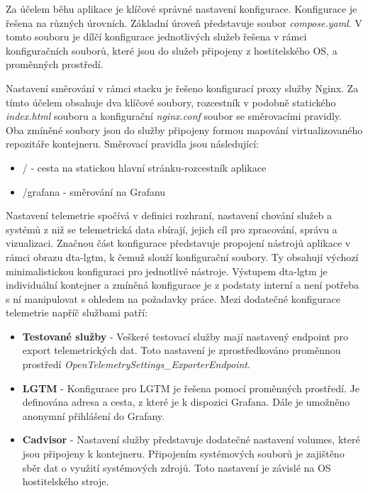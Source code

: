 
Za účelem běhu aplikace je klíčové správné nastavení konfigurace. Konfigurace je řešena na různých úrovních. Základní úroveň představuje soubor \emph{compose.yaml}. V tomto souboru je dílčí konfigurace jednotlivých služeb řešena v rámci konfiguračních souborů, které jsou do služeb připojeny z hostitelského OS, a proměnných prostředí. 

Nastavení směrování v rámci stacku je řešeno konfigurací proxy služby Nginx. Za tímto účelem obsahuje dva klíčové soubory, rozcestník v podobně statického \emph{index.html} souboru a konfigurační \emph{nginx.conf} soubor se směrovacími pravidly. Oba zmíněné soubory jsou do služby připojeny formou mapování virtualizovaného repozitáře kontejneru. Směrovací pravidla jsou následující:

\begin{itemize}
    \item / - cesta na statickou hlavní stránku-rozcestník aplikace
    \item /grafana - směrování na Grafanu
\end{itemize}

Nastavení telemetrie spočívá v definici rozhraní, nastavení chování služeb a systémů z niž se telemetrická data sbírají, jejich cíl pro zpracování, správu a vizualizaci. Značnou část konfigurace představuje propojení nástrojů aplikace v rámci obrazu dta-lgtm, k čemuž slouží konfigurační soubory. Ty obsahují výchozí minimalistickou konfiguraci pro jednotlivé nástroje. Výstupem dta-lgtm je individuální kontejner a zmíněná konfigurace je z podstaty interní a není potřeba s ní manipulovat s ohledem na požadavky práce. Mezi dodatečné konfigurace telemetrie napříč službami patří:

\begin{itemize}
    \item \textbf{Testované služby} - Veškeré testovací služby mají nastavený endpoint pro export telemetrických dat. Toto nastavení je zprostředkováno proměnnou prostředí \emph{OpenTelemetrySettings\_ExporterEndpoint}.
    \item \textbf{LGTM} - Konfigurace pro LGTM je řešena pomocí proměnných prostředí. Je definována adresa a cesta, z které je k dispozici Grafana. Dále je umožněno anonymní přihlášení do Grafany.
    \item \textbf{Cadvisor} - Nastavení služby představuje dodatečné nastavení volumes, které jsou připojeny k kontejneru. Připojením systémových souborů je zajištěno sběr dat o využití systémových zdrojů. Toto nastavení je závislé na OS hostitelského stroje.
\end{itemize}

